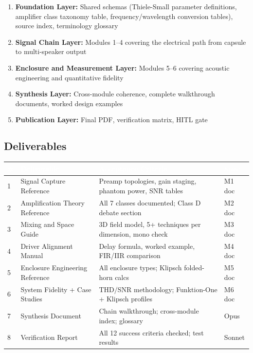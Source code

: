 \documentclass[11pt,letterpaper]{article}
\newcommand{\tableheader}[1]{\textbf{\sffamily\textcolor{white}{#1}}}
\begin{document}
\begin{enumerate}
  \item \textbf{Foundation Layer:} Shared schemas (Thiele-Small parameter definitions, amplifier class taxonomy table, frequency/wavelength conversion tables), source index, terminology glossary
  \item \textbf{Signal Chain Layer:} Modules 1--4 covering the electrical path from capsule to multi-speaker output
  \item \textbf{Enclosure and Measurement Layer:} Modules 5--6 covering acoustic engineering and quantitative fidelity
  \item \textbf{Synthesis Layer:} Cross-module coherence, complete walkthrough documents, worked design examples
  \item \textbf{Publication Layer:} Final PDF, verification matrix, HITL gate
\end{enumerate}

\subsection{Deliverables}

\begin{center}
\begin{tabularx}{\textwidth}{C{0.5cm}L{3.5cm}XL{2cm}}
\toprule
{}
\tableheader{\#} & \tableheader{Deliverable} & \tableheader{Acceptance Criteria} & \tableheader{Spec} \\
 & Signal Capture Reference & Preamp topologies, gain staging, phantom power, SNR tables & M1 doc \\
2 & Amplification Theory Reference & All 7 classes documented; Class D debate section & M2 doc \\
3 & Mixing and Space Guide & 3D field model, 5+ techniques per dimension, mono check & M3 doc \\
4 & Driver Alignment Manual & Delay formula, worked example, FIR/IIR comparison & M4 doc \\
5 & Enclosure Engineering Reference & All enclosure types; Klipsch folded-horn calcs & M5 doc \\
6 & System Fidelity + Case Studies & THD/SNR methodology; Funktion-One + Klipsch profiles & M6 doc \\
7 & Synthesis Document & Chain walkthrough; cross-module index; glossary & Opus \\
8 & Verification Report & All 12 success criteria checked; test results & Sonnet \\
\bottomrule
\end{tabularx}
\end{center}
\end{document}
